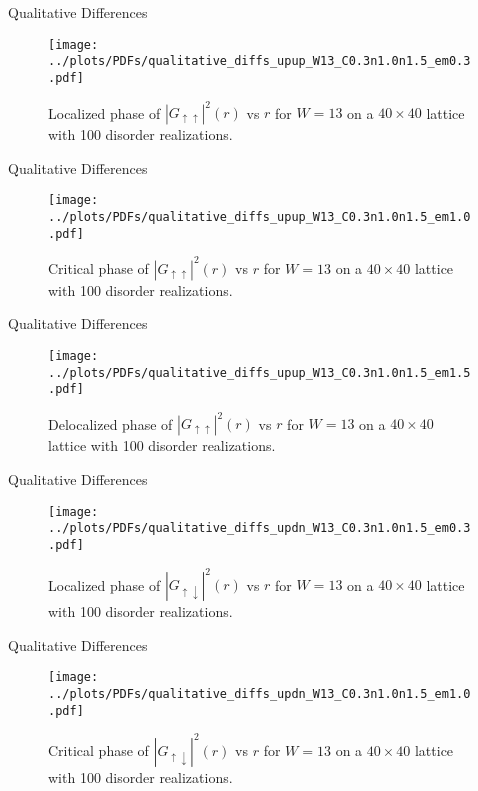 \documentclass[]{beamer}
\begin{document}
\begin{frame}{Qualitative Differences}
    \begin{figure}
        \centering
        \texttt{[image: ../plots/PDFs/qualitative\_diffs\_upup\_W13\_C0.3n1.0n1.5\_em0.3.pdf]}
        \caption{Localized phase of $|G_{\uparrow\uparrow}|^2(r)$ vs $r$ for $W = 13$ on a $40\times40$
                lattice with 100 disorder realizations.}
    \end{figure}        
\end{frame}

\begin{frame}{Qualitative Differences}
    \begin{figure}
        \centering
        \texttt{[image: ../plots/PDFs/qualitative\_diffs\_upup\_W13\_C0.3n1.0n1.5\_em1.0.pdf]}
        \caption{Critical phase of $|G_{\uparrow\uparrow}|^2(r)$ vs $r$ for $W = 13$ on a $40\times40$
                lattice with 100 disorder realizations.}
    \end{figure}        
\end{frame}

\begin{frame}{Qualitative Differences}
    \begin{figure}
        \centering
        \texttt{[image: ../plots/PDFs/qualitative\_diffs\_upup\_W13\_C0.3n1.0n1.5\_em1.5.pdf]}
        \caption{Delocalized phase of $|G_{\uparrow\uparrow}|^2(r)$ vs $r$ for $W = 13$ on a $40\times40$
                lattice with 100 disorder realizations.}
    \end{figure}        
\end{frame}

\begin{frame}{Qualitative Differences}
    \begin{figure}
        \centering
        \texttt{[image: ../plots/PDFs/qualitative\_diffs\_updn\_W13\_C0.3n1.0n1.5\_em0.3.pdf]}
        \caption{Localized phase of $|G_{\uparrow\downarrow}|^2(r)$ vs $r$ for $W = 13$ on a $40\times40$
                lattice with 100 disorder realizations.}
    \end{figure}        
\end{frame}

\begin{frame}{Qualitative Differences}
    \begin{figure}
        \centering
        \texttt{[image: ../plots/PDFs/qualitative\_diffs\_updn\_W13\_C0.3n1.0n1.5\_em1.0.pdf]}
        \caption{Critical phase of $|G_{\uparrow\downarrow}|^2(r)$ vs $r$ for $W = 13$ on a $40\times40$
                lattice with 100 disorder realizations.}
    \end{figure}        
\end{frame}
\end{document}
